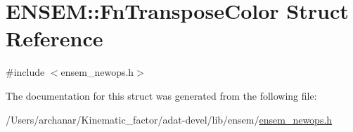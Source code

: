 \hypertarget{structENSEM_1_1FnTransposeColor}{}\section{E\+N\+S\+EM\+:\+:Fn\+Transpose\+Color Struct Reference}
\label{structENSEM_1_1FnTransposeColor}


{\ttfamily \#include $<$ensem\+\_\+newops.\+h$>$}



The documentation for this struct was generated from the following file\+:\begin{DoxyCompactItemize}
\item 
/\+Users/archanar/\+Kinematic\+\_\+factor/adat-\/devel/lib/ensem/\mbox{\hyperlink{adat-devel_2lib_2ensem_2ensem__newops_8h}{ensem\+\_\+newops.\+h}}\end{DoxyCompactItemize}
